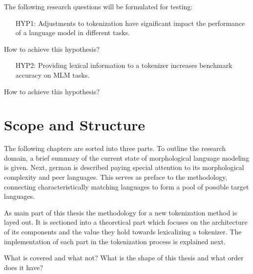 The following research questions will be formulated for testing:
\begin{framed}
    \begin{itemize}[itemindent=1em]
        \item[HYP1:] Adjustments to tokenization have significant impact the performance of a language model in different tasks.
    \end{itemize}
\end{framed}
How to achieve this hypothesis?
\begin{framed}
    \begin{itemize}[itemindent=1em]
        \item[HYP2:] Providing lexical information to a tokenizer increases benchmark accuracy on MLM tasks.
    \end{itemize}
\end{framed}
How to achieve this hypothesis?

\section{Scope and Structure}
\label{sec:scope-and-structure}

The following chapters are sorted into three parts.
To outline the research domain, a brief summary of the current state of morphological language modeling is given.
Next, german is described paying special attention to its morphological complexity and peer languages.
This serves as preface to the methodology, connecting characteristically matching languages to form a pool of possible  target languages.

As main part of this thesis the methodology for a new tokenization method is layed out.
It is sectioned into a theoretical part which focuses on the architecture of its components and the value they hold towards lexicalizing a tokenizer.
The implementation of each part in the tokenization process is explained next.

What is covered and what not?
What is the shape of this thesis and what order does it have?
